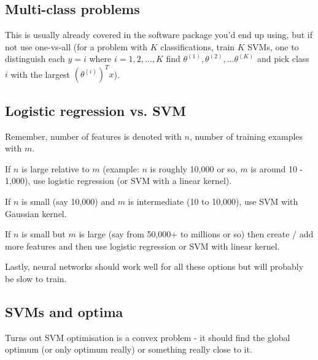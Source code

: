 \subsection{Multi-class problems}

This is usually already covered in the software package you'd end up using, but if not use one-vs-all (for a problem with $K$ classifications, train $K$ SVMs, one to distinguish each $y = i$ where $i = 1, 2, \dots, K$ find $\theta^{(1)}, \theta^{(2)}, \dots \theta^{(K)}$ and pick class $i$ with the largest $(\theta^{(i)})^Tx$).

\subsection{Logistic regression vs. SVM}

Remember, number of features is denoted with $n$, number of training examples with $m$.

If $n$ is large relative to $m$ (example: $n$ is roughly 10,000 or so, $m$ is around 10 - 1,000), use logistic regression (or SVM with a linear kernel).

If $n$ is small (say 10,000) and $m$ is intermediate (10 to 10,000), use SVM with Gaussian kernel.

If $n$ is small but $m$ is large (say from 50,000+ to millions or so) then create / add more features and then use logistic regression or SVM with linear kernel.

Lastly, neural networks should work well for all these options but will probably be slow to train.

\subsection{SVMs and optima}

Turns out SVM optimisation is a convex problem - it should find the global optimum (or only optimum really) or something really close to it.